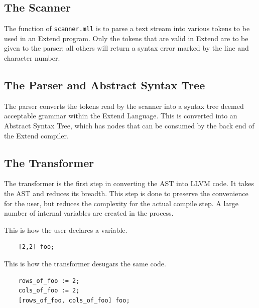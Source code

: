   \subsection{The Scanner}
  The function of \texttt{scanner.mll} is to parse a text stream into various tokens to be used in an Extend program.
  Only the tokens that are valid in Extend are to be given to the parser; all others will return a syntax error marked by the line and character number.

  \subsection{The Parser and Abstract Syntax Tree}
  The parser converts the tokens read by the scanner into a syntax tree deemed acceptable grammar within the Extend Language. This is converted into an Abstract Syntax Tree, which has nodes that can be consumed by the back end of the Extend compiler.

  \subsection{The Transformer}
The transformer is the first step in converting the AST into LLVM code. It takes the AST and reduces its breadth. This step is done to preserve the convenience for the user, but reduces the complexity for the actual compile step. A large number of internal variables are created in the process.

  \medskip \noindent This is how the user declares a variable.
  \begin{lstlisting}
    [2,2] foo;
  \end{lstlisting}

  \medskip \noindent This is how the transformer desugars the same code.
  \begin{lstlisting}
    rows_of_foo := 2;
    cols_of_foo := 2;
    [rows_of_foo, cols_of_foo] foo;
  \end{lstlisting}

